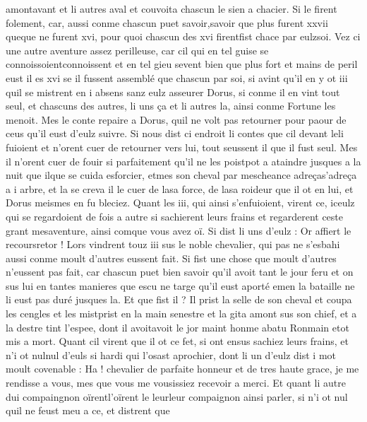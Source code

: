 \documentclass{article}
\begin{document}
\begin{pages}
   amontavant et li autres aval et couvoita chascun le sien a 
   chacier. Si le firent folement, car, aussi conme chascun puet 
   savoir,savoir que plus furent xxvii 
   queque ne furent xvi, pour quoi chascun des xvi 
   firentfist chace par 
   eulzsoi. Vez ci une autre aventure assez perilleuse, car cil qui 
   en tel guise se 
   connoissoientconnoissent et 
   en tel gieu sevent bien que plus fort et mains de peril eust il es xvi se il fussent assemblé que chascun par soi, 
   si avint qu’il en y ot iii quil se mistrent en i absens sanz eulz asseurer Dorus, 
   si conme il en vint tout seul, et chascuns des autres, li uns ça et li autres la, ainsi conme Fortune les menoit. 
   Mes le conte repaire a Dorus, quil ne volt pas retourner pour 
   paour de ceus qu’il eust d’eulz suivre. Si nous dist ci 
      endroit li contes que cil devant leli fuioient 
   et n’orent cuer de retourner vers lui, tout seussent il que il fust seul. Mes il 
   n’orent cuer de fouir si parfaitement 
   qu’il ne les poistpot a ataindre jusques a la nuit 
   que ilque se cuida esforcier, 
   etmes son cheval par mescheance 
   adreças'adreça a i arbre, et la se creva il le cuer de 
   lasa force, de lasa 
   roideur que il ot en lui, et Dorus meismes en 
   fu bleciez. \pend
\pstart Quant les iii, qui ainsi s’enfuioient, virent ce, 
   iceulz qui se regardoient de fois a autre 
   si sachierent leurs frains et regarderent ceste grant mesaventure, 
   ainsi comque vous avez oï. Si dist li uns d’eulz :
   Or affiert le recoursretor !
   Lors vindrent touz iii sus le noble chevalier, 
   qui pas ne s’esbahi aussi conme moult d’autres eussent fait. Si fist une chose que moult d’autres n’eussent pas fait, 
   car chascun puet bien savoir qu’il avoit tant le jour feru et on sus lui en tantes manieres que escu ne 
      targe qu’il eust aporté emen la bataille ne li eust pas duré jusques la. Et que fist il ? Il prist la selle de son cheval 
   et coupa les cengles et les mistprist en la main senestre et la gita amont 
   sus son chief, et a la destre tint l’espee, dont il avoitavoit le jor 
   maint honme abatu 
   Ronmain etot mis a mort. Quant cil virent que il ot ce fet, si ont ensus sachiez leurs frains, 
   et n’i ot nulnul d'euls si hardi qui l’osast aprochier, dont li un d’eulz dist i mot moult covenable :
   Ha ! chevalier de parfaite honneur et de tres haute grace, je me rendisse a vous, 
   mes que vous me vousissiez recevoir a merci.
   Et quant li autre dui compaingnon 
   oïrentl'oïrent le 
   leurleur compaignon ainsi parler, si n’i ot nul quil ne feust meu a ce, et distrent que 

\end{pages}
\end{document}
